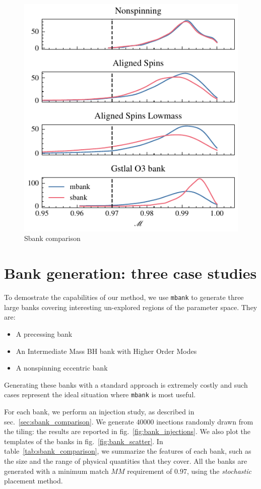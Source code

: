 \documentclass[twocolumn,showpacs,preprintnumbers,nofootinbib,prd,
superscriptaddress,10pt]{revtex4-1}
\begin{document}
\begin{figure}[t]
	\includegraphics{sbank_comparison}
	\caption{Sbank comparison}
	\label{fig:sbank_comparison}
\end{figure}


\section{Bank generation: three case studies} \label{sec:bank_generation}

To demostrate the capabilities of our method, we use \texttt{mbank} to generate three large banks covering interesting un-explored regions of the parameter space.
They are:
	\begin{itemize}
		\item A precessing bank
		\item An Intermediate Mass BH bank with Higher Order Modes
		\item A nonspinning eccentric bank
	\end{itemize}
Generating these banks with a standard approach is extremely costly and such cases represent the ideal situation where \texttt{mbank} is most useful.

For each bank, we perform an injection study, as described in sec.~\ref{sec:sbank_comparison}. We generate $40000$ inections randomly drawn from the tiling: the results are reported in fig.~\ref{fig:bank_injections}. We also plot the templates of the banks in fig.~\ref{fig:bank_scatter}.
In table~\ref{tab:sbank_comparison}, we summarize the features of each bank, such as the size and the range of physical quantities that they cover.
All the banks are generated with a minimum match $MM$ requirement of $0.97$, using the {\it stochastic} placement method.
\end{document}
